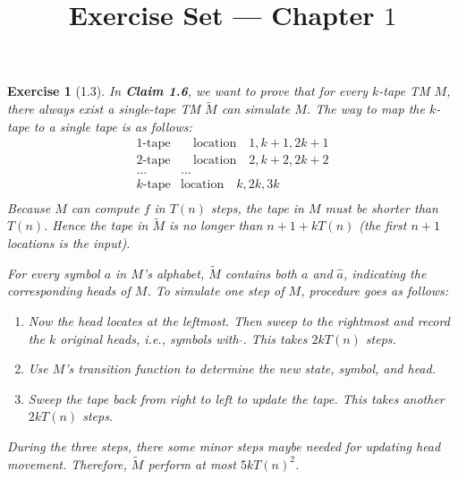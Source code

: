 \documentclass[a4paper]{article}
\title{Exercise Set --- Chapter $1$}
\date{}
\newtheorem*{exercise}{Exercise}
\begin{document}
\maketitle

\begin{exercise}[1.3]
	In \textbf{Claim 1.6}, we want to prove that for every $k$-tape TM $M$,
    there always exist a single-tape TM $\widetilde{M}$ can simulate $M$.
    The way to map the $k$-tape to a single tape is as follows:
		$$
        \begin{matrix}		
            1\text{-tape}&\quad \text{location}\quad 1, k+1, 2k+1\\			
             2\text{-tape}&\quad \text{location}\quad 2, k+2, 2k+2\\			
			 \dots&\dots\\			
             k\text{-tape}&\text{location}\quad k, 2k, 3k\\			
		\end{matrix}
        $$
	Because $M$ can compute $f$ in $T(n)$ steps, the tape in $M$ must be shorter than $T(n)$.
    Hence the tape in $\widetilde{M}$ is no longer than $n+1+kT(n)$ (the first $n+1$ locations is the input).

	For every symbol $a$ in $M$'s alphabet, $\widetilde{M}$ contains both $a$ and $\widehat{a}$, 
    indicating the corresponding heads of $M$. 
	To simulate one step of $M$, procedure goes as follows:
    \begin{enumerate}
        \item Now the head locates at the leftmost.
            Then sweep to the rightmost and record the $k$ original heads, i.e., symbols with $\widehat{ }$. 
            This takes $2kT(n)$ steps.
        \item Use $M$'s transition function to determine the new state, symbol, and head.
        \item Sweep the tape back from right to left to update the tape. 
            This takes another $2kT(n)$ steps.
    \end{enumerate}
	During the three steps, there some minor steps maybe needed for updating head movement. 
	Therefore, $\widetilde{M}$ perform at most $5kT(n)^2$. 
\end{exercise}
\end{document}
